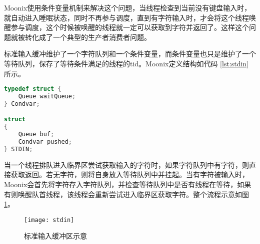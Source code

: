 Moonix使用条件变量机制来解决这个问题，当线程检查到当前没有键盘输入时，就自动进入睡眠状态，同时不再参与调度，直到有字符输入时，才会将这个线程唤醒参与调度，这个时候被唤醒的线程就一定可以获取到字符并返回了。这样这个问题就被转化成了一个典型的生产者消费者问题。

标准输入缓冲维护了一个字符队列和一个条件变量，而条件变量也只是维护了一个等待队列，保存了等待条件满足的线程的tid。Moonix定义结构如代码 \ref{lst:stdin} 所示。

\begin{minipage}[c]{0.95\textwidth}
\begin{lstlisting}[language={C}, caption={标准输入缓冲和条件变量}, label={lst:stdin}]
typedef struct {
	Queue waitQueue;
} Condvar;

struct
{
	Queue buf;
	Condvar pushed;
} STDIN;
\end{lstlisting}
\end{minipage}

当一个线程排队进入临界区尝试获取输入的字符时，如果字符队列中有字符，则直接获取返回。若无字符，则将自身放入等待队列中并挂起。当有字符被输入时，Moonix会首先将字符存入字符队列，并检查等待队列中是否有线程在等待，如果有则唤醒队首线程，该线程会重新尝试进入临界区获取字符。整个流程示意如图 \ref{pic:stdin}。

\begin{figure}[htpb]
	\centering
	\texttt{[image: stdin]}
	\setlength{\abovecaptionskip}{2pt}
	\caption{标准输入缓冲区示意}
	\label{pic:stdin}
\end{figure}